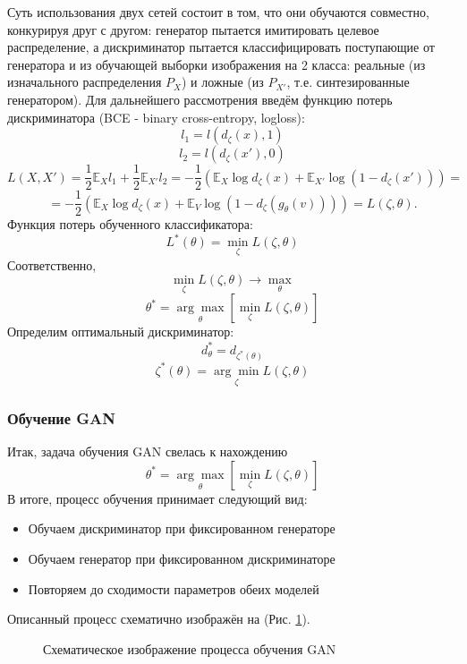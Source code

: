 			Суть использования двух сетей состоит в том, что они обучаются совместно, конкурируя друг с другом: генератор пытается имитировать целевое распределение, а дискриминатор пытается классифицировать поступающие от генератора и из обучающей выборки изображения на 2 класса: реальные (из изначального распределения $P_X$) и ложные (из $P_{X'}$, т.е. синтезированные генератором).
			Для дальнейшего рассмотрения введём функцию потерь дискриминатора (BCE - binary cross-entropy, logloss):
			$$ l_1 = l(d_{\zeta}(x), 1) $$
			$$ l_2 = l(d_{\zeta}(x'), 0) $$
			$$ L(X, X') = \frac{1}{2} \mathbb{E}_{X} l_1 + \frac{1}{2} \mathbb{E}_{X'} l_2 = -\frac{1}{2} (\mathbb{E}_{X} \log d_{\zeta}(x) + \mathbb{E}_{X'} \log (1 - d_{\zeta}(x'))) = $$
			$$ =  -\frac{1}{2} (\mathbb{E}_{X} \log d_{\zeta}(x) + \mathbb{E}_{V} \log (1 - d_{\zeta}(g_{\theta}(v)))) = L(\zeta, \theta) .$$
			Функция потерь обученного классификатора:
			$$ L^*(\theta) = \underset{\zeta}{\min} L(\zeta, \theta) $$
			Соответственно,
			$$ \underset{\zeta}{\min} L(\zeta, \theta) \longrightarrow \underset{\theta}{\max} $$
			$$ \theta^* = \underset{\theta}{\arg\max} \left[ \underset{\zeta}{\min} L(\zeta, \theta) \right] $$
			Определим оптимальный дискриминатор:
			$$ d^*_{\theta} = d_{\zeta^*(\theta)} $$
			$$ \zeta^*(\theta) =  \underset{\zeta}{\arg\min} L(\zeta, \theta)$$
			
		\subsubsection{Обучение GAN}
			Итак, задача обучения GAN свелась к нахождению
			$$ \theta^* = \underset{\theta}{\arg\max} \left[ \underset{\zeta}{\min} L(\zeta, \theta) \right] $$
			В итоге, процесс обучения принимает следующий вид:
	
			\begin{itemize}
				\item Обучаем дискриминатор при фиксированном генераторе
				\item Обучаем генератор при фиксированном дискриминаторе
				\item Повторяем до сходимости параметров обеих моделей
			\end{itemize}
			Описанный процесс схематично изображён на (Рис. \ref{5-gan-training}).
	
			\begin{figure}[h!]
				\caption{Схематическое изображение процесса обучения GAN}
				\label{5-gan-training}
			\end{figure}
	
